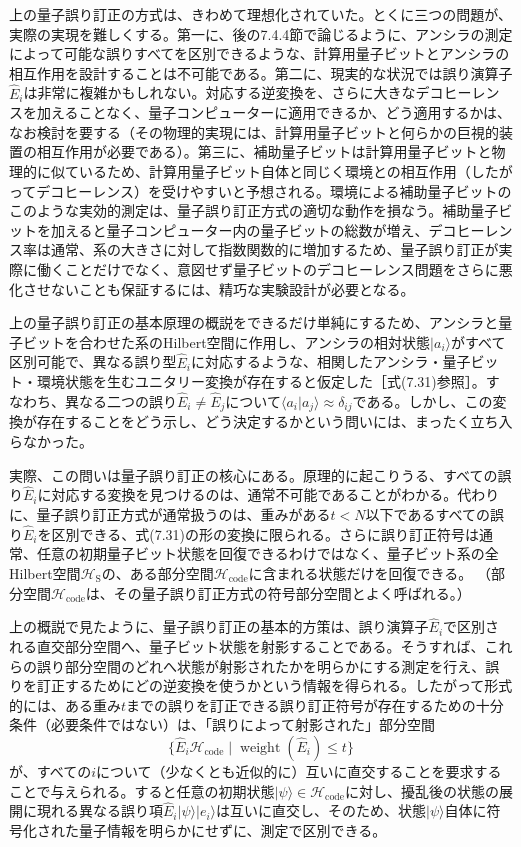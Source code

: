 上の量子誤り訂正の方式は、きわめて理想化されていた。とくに三つの問題が、実際の実現を難しくする。第一に、後の7.4.4節で論じるように、アンシラの測定によって可能な誤りすべてを区別できるような、計算用量子ビットとアンシラの相互作用を設計することは不可能である。第二に、現実的な状況では誤り演算子$\hat E_i$は非常に複雑かもしれない。対応する逆変換を、さらに大きなデコヒーレンスを加えることなく、量子コンピューターに適用できるか、どう適用するかは、なお検討を要する（その物理的実現には、計算用量子ビットと何らかの巨視的装置の相互作用が必要である）。第三に、補助量子ビットは計算用量子ビットと物理的に似ているため、計算用量子ビット自体と同じく環境との相互作用（したがってデコヒーレンス）を受けやすいと予想される。環境による補助量子ビットのこのような実効的測定は、量子誤り訂正方式の適切な動作を損なう。補助量子ビットを加えると量子コンピューター内の量子ビットの総数が増え、デコヒーレンス率は通常、系の大きさに対して指数関数的に増加するため、量子誤り訂正が実際に働くことだけでなく、意図せず量子ビットのデコヒーレンス問題をさらに悪化させないことも保証するには、精巧な実験設計が必要となる。

上の量子誤り訂正の基本原理の概説をできるだけ単純にするため、アンシラと量子ビットを合わせた系のHilbert空間に作用し、アンシラの相対状態$|a_i\rangle$がすべて区別可能で、異なる誤り型$\hat E_i$に対応するような、相関したアンシラ・量子ビット・環境状態を生むユニタリー変換が存在すると仮定した［式(7.31)参照］。すなわち、異なる二つの誤り$\hat E_i\ne\hat E_j$について$\langle a_i|a_j\rangle\approx\delta_{ij}$である。しかし、この変換が存在することをどう示し、どう決定するかという問いには、まったく立ち入らなかった。

実際、この問いは量子誤り訂正の核心にある。原理的に起こりうる、すべての誤り$\hat E_i$に対応する変換を見つけるのは、通常不可能であることがわかる。代わりに、量子誤り訂正方式が通常扱うのは、重みがある$t<N$以下であるすべての誤り$\hat E_i$を区別できる、式(7.31)の形の変換に限られる。さらに誤り訂正符号は通常、任意の初期量子ビット状態を回復できるわけではなく、量子ビット系の全Hilbert空間$\mathcal H_{\mathrm S}$の、ある部分空間$\mathcal H_{\mathrm{code}}$に含まれる状態だけを回復できる。
\hypertarget{srcpage:315}{}\label{srcpage:315}
（部分空間$\mathcal H_{\mathrm{code}}$は、その量子誤り訂正方式の符号部分空間とよく呼ばれる。）

上の概説で見たように、量子誤り訂正の基本的方策は、誤り演算子$\hat E_i$で区別される直交部分空間へ、量子ビット状態を射影することである。そうすれば、これらの誤り部分空間のどれへ状態が射影されたかを明らかにする測定を行え、誤りを訂正するためにどの逆変換を使うかという情報を得られる。したがって形式的には、ある重み$t$までの誤りを訂正できる誤り訂正符号が存在するための十分条件（必要条件ではない）は、「誤りによって射影された」部分空間
\begin{equation}\{\hat E_i\mathcal H_{\mathrm{code}}\mid\operatorname{weight}(\hat E_i)\leq t\}\tag{7.35}\end{equation}
が、すべての$i$について（少なくとも近似的に）互いに直交することを要求することで与えられる。すると任意の初期状態$|\psi\rangle\in\mathcal H_{\mathrm{code}}$に対し、擾乱後の状態の展開に現れる異なる誤り項$\hat E_i|\psi\rangle|e_i\rangle$は互いに直交し、そのため、状態$|\psi\rangle$自体に符号化された量子情報を明らかにせずに、測定で区別できる。

